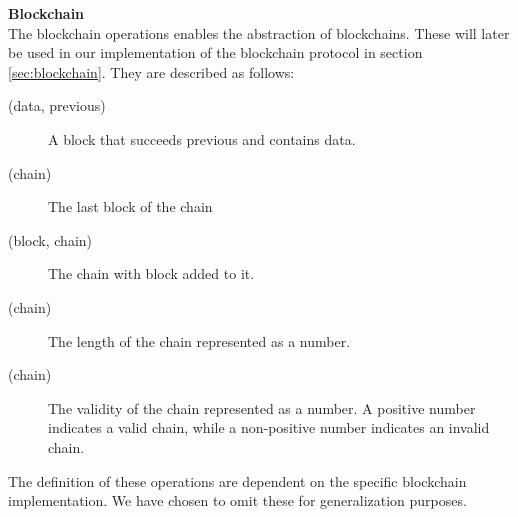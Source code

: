 \FloatBarrier

\textbf{Blockchain}\\
The blockchain operations enables the abstraction of blockchains. These will later be used in our implementation of the blockchain protocol in section \ref{sec:blockchain}.
They are described as follows:

\begin{description}
	\item[(data, previous)]
	A block that succeeds previous and contains data.
	\item[(chain)]
	The last block of the chain
	\item[(block, chain)]
	The chain with block added to it.
	\item[(chain)]
	The length of the chain represented as a number.
	\item[(chain)]
	The validity of the chain represented as a number. A positive number indicates a valid chain, while a non-positive number indicates an invalid chain.
\end{description}

The definition of these operations are dependent on the specific blockchain implementation. We have chosen to omit these for generalization purposes.
